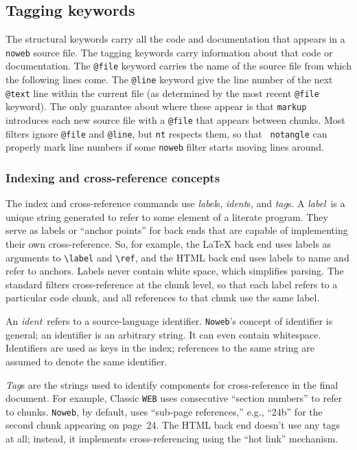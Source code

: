 \documentclass{article}
\makeatletter
\newcommand\kw[1]{\texttt{@#1}}
\renewcommand\label{{\rm\it label\/}}
\newcommand\tag{{\rm\it tag\/}}
\newcommand\ident{{\rm\it ident\/}}
\makeatother
\begin{document}
\subsection{Tagging keywords}

The structural keywords carry all the code and documentation that
appears in a {\tt noweb} source file.
The tagging keywords carry information about that code or
documentation.
The \kw{file} keyword carries the name of the source file from which the
following lines come.
The \kw{line} keyword give the line number of the next \kw{text} line
within the current file (as determined by the most recent \kw{file}
keyword). 
The only guarantee about where these appear is that {\tt markup}
introduces each new source file with a \kw{file} that appears between
chunks.
Most filters ignore \kw{file} and \kw{line}, but {\tt nt}
respects them, so that {\tt
notangle} can properly mark line numbers if some {\tt noweb}
filter starts moving lines around.


\subsubsection{Indexing and cross-reference concepts}


The index and cross-reference commands use \label s, \ident s, and \tag s.
A \label\ is a unique string generated to refer to some element of a
literate program.
They serve as labels or ``anchor points'' for back ends that are
capable of implementing their own cross-reference.
So, for example, the {\LaTeX} back end uses labels as arguments to \verb+\label+
and \verb+\ref+, and the HTML back end uses labels to name and refer
to anchors.
Labels never contain white space, which simplifies parsing.
The standard filters cross-reference at the chunk level, so that each
label refers to a particular code chunk, and all references to that
chunk use the same label.

An \ident\ refers to a source-language identifier.
{\tt Noweb}'s concept of identifier is general; an identifier is
an arbitrary string.
It can even contain whitespace.
Identifiers are used as keys in the index; references to the same
string are assumed to denote the same identifier.

{\rm\it Tag\/}s are the strings used to identify components for
cross-reference in the final document.
For example, Classic {\tt WEB} uses consecutive ``section numbers'' to
refer to chunks.
{\tt Noweb}, by default, uses ``sub-page references,'' e.g., ``24b''
for the second chunk appearing on page~24.
The HTML back end doesn't use any tags at all; instead, it
implements cross-referencing using the ``hot link'' mechanism.
\end{document}
